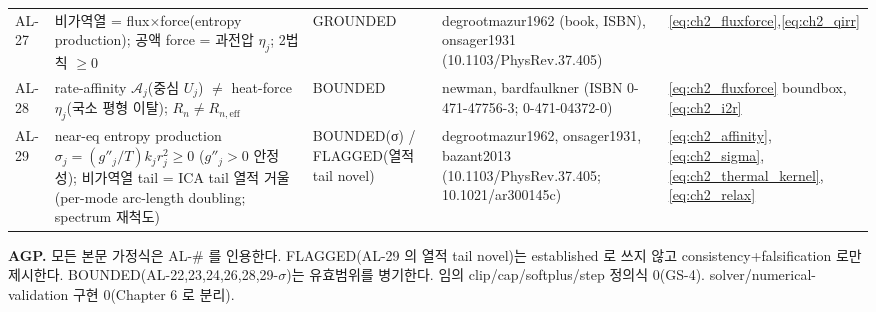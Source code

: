 \documentclass[11pt,a4paper]{article}
\newcommand{\eff}{\mathrm{eff}}
\begin{document}
{\begin{longtable}{p{} p{} p{} p{} p{}}
AL-27 & 비가역열 = flux$\times$force(entropy production); 공액 force = 과전압 $\eta_j$; 2법칙 $\ge0$ & GROUNDED & degrootmazur1962 (book, ISBN), onsager1931 (10.1103/PhysRev.37.405) & \eqref{eq:ch2_fluxforce},\eqref{eq:ch2_qirr} \\
AL-28 & rate-affinity $\mathcal A_j$(중심 $U_j$) $\ne$ heat-force $\eta_j$(국소 평형 이탈); $R_n\ne R_{n,\eff}$ & BOUNDED & newman, bardfaulkner (ISBN 0-471-47756-3; 0-471-04372-0) & \eqref{eq:ch2_fluxforce} boundbox,\eqref{eq:ch2_i2r} \\
AL-29 & near-eq entropy production $\sigma_j=(g''_j/T)k_j r_j^2\ge0$ ($g''_j>0$ 안정성); 비가역열 tail = ICA tail 열적 거울 (per-mode arc-length doubling; spectrum 재척도) & BOUNDED(σ) / FLAGGED(열적 tail novel) & degrootmazur1962, onsager1931, bazant2013 (10.1103/PhysRev.37.405; 10.1021/ar300145c) & \eqref{eq:ch2_affinity},\eqref{eq:ch2_sigma},\eqref{eq:ch2_thermal_kernel},\eqref{eq:ch2_relax} \\
\bottomrule
\end{longtable}
}
\textbf{AGP.} 모든 본문 가정식은 AL-\# 를 인용한다. FLAGGED(AL-29 의 열적 tail novel)는 established 로 쓰지
않고 consistency+falsification 로만 제시한다. BOUNDED(AL-22,23,24,26,28,29-$\sigma$)는 유효범위를 병기한다.
임의 clip/cap/softplus/step 정의식 0(GS-4). solver/numerical-validation 구현 0(Chapter 6 로 분리).

\end{document}
